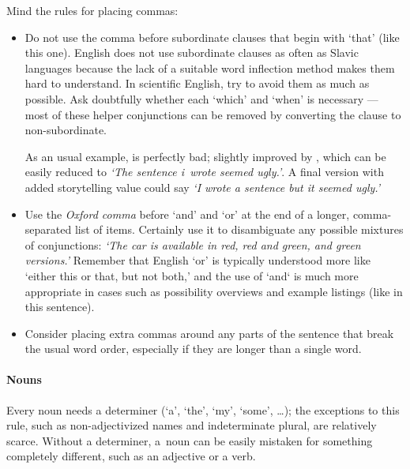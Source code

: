 Mind the rules for placing commas:
\begin{itemize}
\item Do not use the comma before subordinate clauses that begin with `that' (like this one). English does not use subordinate clauses as often as Slavic languages because the lack of a suitable word inflection method makes them hard to understand. In scientific English, try to avoid them as much as possible. Ask doubtfully whether each `which' and `when' is necessary --- most of these helper conjunctions can be removed by converting the clause to non-subordinate.

As an usual example,  is perfectly bad; slightly improved by , which can be easily reduced to \textit{`The sentence i~wrote seemed ugly.'}. A final version with added storytelling value could say \textit{`I wrote a sentence but it seemed ugly.'}
\item Use the \emph{Oxford comma} before `and' and `or' at the end of a longer, comma-separated list of items. Certainly use it to disambiguate any possible mixtures of conjunctions: \textit{`The car is available in red, red and green, and green versions.'} Remember that English `or' is typically understood more like `either this or that, but not both,' and the use of `and` is much more appropriate in cases such as possibility overviews and example listings (like in this sentence).
\item Consider placing extra commas around any parts of the sentence that break the usual word order, especially if they are longer than a single word.
\end{itemize}

\paragraph{Nouns}
Every noun needs a determiner (`a', `the', `my', `some', \dots); the exceptions to this rule, such as non-adjectivized names and indeterminate plural, are relatively scarce. Without a determiner, a~noun can be easily mistaken for something completely different, such as an adjective or a verb.

